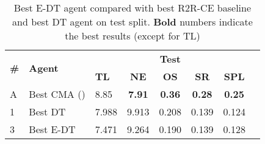 \begin{table*}

\caption{\label{table:e_dt_test_final} Best E-DT agent compared with best R2R-CE baseline and best DT agent on test split. \textbf{Bold} numbers indicate the best results (except for TL)}
\renewcommand{\arraystretch}{1.2}
\centering
\small\addtolength{\tabcolsep}{-2.3pt}
\begin{tabular}{@{}lllccccc@{}}
\toprule
   \multirow{2}{*}{\textbf{\#}}
  & \multirow{2}{*}{\textbf{Agent}}
  & \multicolumn{5}{c}{\textbf{Test}} \\
  \cmidrule(l){3-7}
  & & \textbf{TL} & \textbf{NE} & \textbf{OS} & \textbf{SR} & \textbf{SPL} \\
\midrule
A & Best CMA (\citet{VLNCE})  & 8.85 & \textbf{7.91} & \textbf{0.36} & \textbf{0.28} & \textbf{0.25}  \\
\midrule
1 & Best DT  & 7.988 & 	9.913 & 0.208 & 0.139 & 0.124  \\
\midrule
3 & Best E-DT  & 7.471 & 	9.264 & 0.190 & 0.139 & 0.128  \\

\bottomrule
\end{tabular}
\end{table*}
